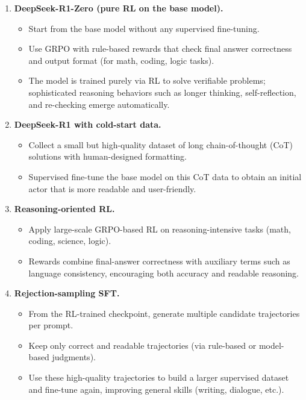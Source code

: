 \documentclass[11pt]{article}
\theoremstyle{remark}
\begin{document}
\begin{enumerate}[label=\arabic*)]
  \item \textbf{DeepSeek-R1-Zero (pure RL on the base model).}
  \begin{itemize}
    \item Start from the base model without any supervised fine-tuning.
    \item Use GRPO with rule-based rewards that check final answer correctness and output format (for math, coding, logic tasks).
    \item The model is trained purely via RL to solve verifiable problems; sophisticated reasoning behaviors such as longer thinking, self-reflection, and re-checking emerge automatically.
  \end{itemize}

  \item \textbf{DeepSeek-R1 with cold-start data.}
  \begin{itemize}
    \item Collect a small but high-quality dataset of long chain-of-thought (CoT) solutions with human-designed formatting.
    \item Supervised fine-tune the base model on this CoT data to obtain an initial actor that is more readable and user-friendly.
  \end{itemize}

  \item \textbf{Reasoning-oriented RL.}
  \begin{itemize}
    \item Apply large-scale GRPO-based RL on reasoning-intensive tasks (math, coding, science, logic).
    \item Rewards combine final-answer correctness with auxiliary terms such as language consistency, encouraging both accuracy and readable reasoning.
  \end{itemize}

  \item \textbf{Rejection-sampling SFT.}
  \begin{itemize}
    \item From the RL-trained checkpoint, generate multiple candidate trajectories per prompt.
    \item Keep only correct and readable trajectories (via rule-based or model-based judgments).
    \item Use these high-quality trajectories to build a larger supervised dataset and fine-tune again, improving general skills (writing, dialogue, etc.).
  \end{itemize}


\end{enumerate}
\end{document}
